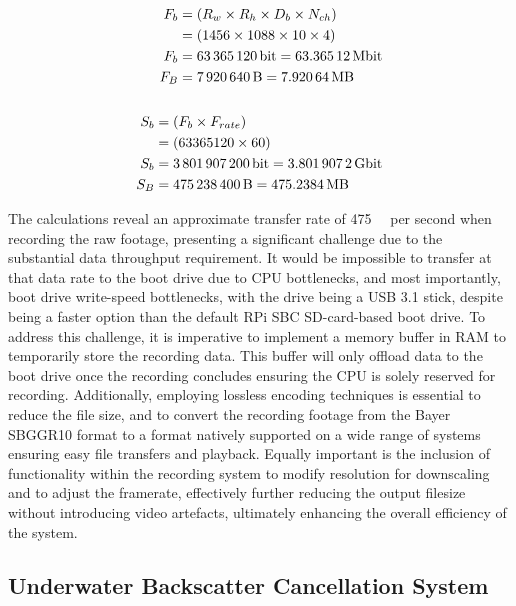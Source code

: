 \begin{align}
    \begin{split} \label{eq:raw_data_per_frame}
        F_b & = (R_w \times R_h \times D_b \times N_{ch}) \\
        & = (1456 \times 1088 \times 10 \times 4) \\
        F_b & = \SI{63365120}{\bit} = \SI{63.36512}{\mega\bit} \\
        F_B & = \SI{7920640}{\byte} = \SI{7.92064}{\mega\byte} 
    \end{split} \\
    \notag \\
    \begin{split} \label{eq:raw_data_per_second}
        S_b & = (F_b \times F_{rate}) \\
        & = (63365120 \times 60) \\
        S_b & = \SI{3801907200}{\bit} = \SI{3.8019072}{\giga\bit} \\
        S_B & = \SI{475238400}{\byte} = \SI{475.2384}{\mega\byte} 
    \end{split}
\end{align}

The calculations reveal an approximate transfer rate of \SI{475}{\mega\byte} per second when recording the raw footage, presenting a significant challenge due to the substantial data throughput requirement. It would be impossible to transfer at that data rate to the boot drive due to CPU bottlenecks, and most importantly, boot drive write-speed bottlenecks, with the drive being a USB 3.1 stick, despite being a faster option than the default RPi SBC SD-card-based boot drive. To address this challenge, it is imperative to implement a memory buffer in RAM to temporarily store the recording data. This buffer will only offload data to the boot drive once the recording concludes ensuring the CPU is solely reserved for recording. Additionally, employing lossless encoding techniques is essential to reduce the file size, and to convert the recording footage from the Bayer SBGGR10 format to a format natively supported on a wide range of systems ensuring easy file transfers and playback. Equally important is the inclusion of functionality within the recording system to modify resolution for downscaling and to adjust the framerate, effectively further reducing the output filesize without introducing video artefacts, ultimately enhancing the overall efficiency of the system.

\subsection{Underwater Backscatter Cancellation System}
\label{designsystem}

